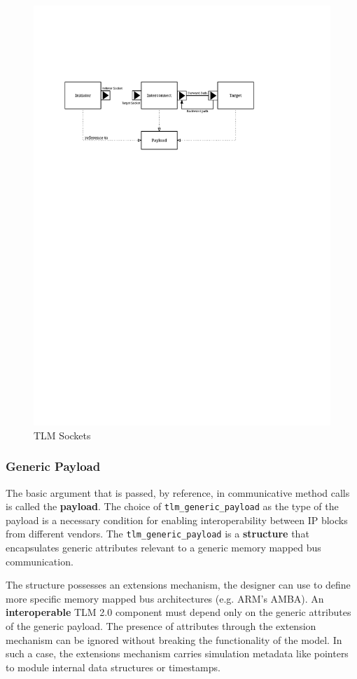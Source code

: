 \documentclass[11pt]{article}
\begin{document}
\begin{figure}[htbp]
\centering
\includegraphics[width=.9\linewidth]{Figures/TLMterminology.pdf}
\caption{\label{fig:orgf1a2d0d}
TLM Sockets}
\end{figure}

\subsubsection{Generic Payload}
\label{sec:org9320766}
The basic argument that is passed, by reference, in communicative method calls is called the \textbf{payload}.
The choice of \texttt{tlm\_generic\_payload} as the type of the payload is a necessary condition for enabling interoperability between IP blocks from different vendors.
The \texttt{tlm\_generic\_payload} is a \textbf{structure} that encapsulates generic attributes relevant to a generic memory mapped bus communication.

The structure possesses an extensions mechanism, the designer can use to define more specific memory mapped bus architectures (e.g. ARM's AMBA).
An \textbf{interoperable} TLM 2.0 component must depend only on the generic attributes of the generic payload.
The presence of attributes through the extension mechanism can be ignored without breaking the functionality of the model.
In such a case, the extensions mechanism carries simulation metadata like pointers to module internal data structures or timestamps.
\end{document}

